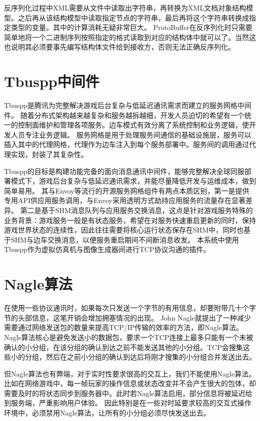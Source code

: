 \par
反序列化过程中XML需要从文件中读取出字符串，再转换为XML文档对象结构模型。之后再从该结构模型中读取指定节点的字符串，最后再将这个字符串转换成指定类型的变量。其中的计算消耗无疑非常巨大。
ProtoBuffer在反序列化时只需要简单地将一个二进制序列按照指定的格式读取到对应的结构体中就可以了。当然这也说明其必须要事先编写结构体文件给到接收方，否则无法正确反序列化。
\section{Tbuspp中间件}
Tbuspp是腾讯为完整解决游戏后台复杂与低延迟通讯需求而建立的服务网格中间件。
随着分布式架构越来越复杂和服务越拆越细，开发人员迫切的希望有一个统一的控制面维护和管理各项服务。边车模式有效分离了系统控制和业务逻辑，使开发人员专注业务逻辑\cite{tbus2}。
服务网格是用于处理服务间通信的基础设施层，服务可以插入其中的代理网格，代理作为边车注入到每个服务部署中\cite{tbus1}。服务间的调用通过代理实现，封装了其复杂性。
\par
Tbuspp的目标是构建功能完备的面向消息通讯中间件，能够完整解决全球同服部署模式下，游戏后台复杂与低延迟通讯需求，并能尽量降低开发与运维成本，做到简单易用。
其与Envoy等流行的开源服务网格组件有两点本质区别，第一是提供专用API供应用服务调用，与Envoy采用透明方式劫持应用服务的流量存在显著差异。
第二是基于SHM消息队列与应用服务交换消息，这点是针对游戏服务特殊的业务背景：游戏服务一般是有状态服务，希望在对服务快速重启更新的同时，保持游戏世界状态的连续性，因此往往需要将核心运行状态保存在SHM中，同时也基于SHM与边车交换消息，以便服务重启期间不间断消息收发。
本系统中使用Tbuspp作为虚拟仿真机与图像生成器间进行TCP协议沟通的插件。
\section{Nagle算法}
在使用一些协议通讯时，如果每次只发送一个字节的有用信息，却要附带几十个字节的头部信息，这笔开销会增加拥塞情况的出现。
John Nagle就提出了一种减少需要通过网络发送包的数量来提高TCP/IP传输的效率\cite{nagle2}的方法，即Nagle算法。
Nagle算法核心是避免发送小的数据包，要求一个TCP连接上最多只能有一个未被确认的小分组，在该分组的确认到达之前不能发送其他的小分组。TCP会搜集这些小的分组，然后在之前小分组的确认到达后将刚才搜集的小分组合并发送出去。
\par
但Nagle算法也有弊端，对于实时性要求很高的交互上，我们不能使用Nagle算法\cite{nagle1}。
比如在网络游戏中，每一帧玩家的操作信息或状态改变并不会产生很大的包体，却需要及时的将状态同步到服务器中。此时若Nagle算法启用，部分信息将被延迟给到服务端，严重影响用户体验。
因此特别是在一些对时延要求较高的交互式操作环境中，必须禁用Nagle算法，让所有的小分组必须尽快发送出去。

